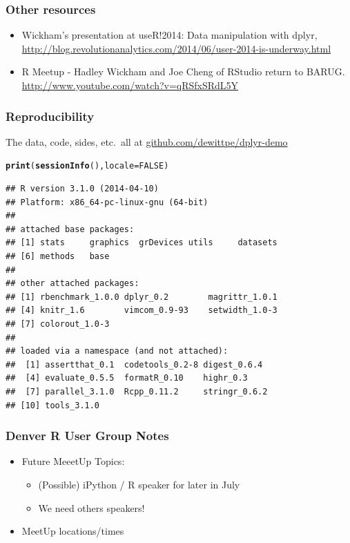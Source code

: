 \documentclass{beamer}\usepackage[]{graphicx}\usepackage[]{color}
\makeatletter
\newcommand{\hlnum}[1]{\textcolor[rgb]{0.686,0.059,0.569}{#1}}%
\newcommand{\hlstd}[1]{\textcolor[rgb]{0.345,0.345,0.345}{#1}}%
\newcommand{\hlkwc}[1]{\textcolor[rgb]{0.333,0.667,0.333}{#1}}%
\newcommand{\hlkwd}[1]{\textcolor[rgb]{0.737,0.353,0.396}{\textbf{#1}}}%
\newenvironment{kframe}{%
 \def\at@end@of@kframe{}%
 \ifinner\ifhmode%
  \def\at@end@of@kframe{\end{minipage}}%
  \begin{minipage}{\columnwidth}%
 \fi\fi%
 \def\FrameCommand##1{\hskip\@totalleftmargin \hskip-\fboxsep
 \colorbox{shadecolor}{##1}\hskip-\fboxsep
     \hskip-\linewidth \hskip-\@totalleftmargin \hskip\columnwidth}%
 \MakeFramed {\advance\hsize-\width
   \@totalleftmargin\z@ \linewidth\hsize
   \@setminipage}}%
 {\par\unskip\endMakeFramed%
 \at@end@of@kframe}
\newenvironment{knitrout}{}{} %
\makeatother
\begin{document}
\begin{frame}[fragile]
  \frametitle{Other resources}
  \begin{itemize}
    \item Wickham's presentation at useR!2014: Data manipulation with dplyr,
      \url{http://blog.revolutionanalytics.com/2014/06/user-2014-is-underway.html}

    \item R Meetup - Hadley Wickham and Joe Cheng of RStudio return to BARUG.
      \url{http://www.youtube.com/watch?v=qRSfxSRdL5Y}

  \end{itemize}
\end{frame} 

\begin{frame}[fragile]
  \frametitle{Reproducibility}
  The data, code, sides, etc.\ all at \url{github.com/dewittpe/dplyr-demo}

\begin{knitrout}\footnotesize
{}\color{fgcolor}\begin{kframe}
\begin{alltt}
\hlkwd{print}\hlstd{(}\hlkwd{sessionInfo}\hlstd{(),} \hlkwc{locale} \hlstd{=} \hlnum{FALSE}\hlstd{)}
\end{alltt}
\begin{verbatim}
## R version 3.1.0 (2014-04-10)
## Platform: x86_64-pc-linux-gnu (64-bit)
## 
## attached base packages:
## [1] stats     graphics  grDevices utils     datasets 
## [6] methods   base     
## 
## other attached packages:
## [1] rbenchmark_1.0.0 dplyr_0.2        magrittr_1.0.1  
## [4] knitr_1.6        vimcom_0.9-93    setwidth_1.0-3  
## [7] colorout_1.0-3  
## 
## loaded via a namespace (and not attached):
##  [1] assertthat_0.1  codetools_0.2-8 digest_0.6.4   
##  [4] evaluate_0.5.5  formatR_0.10    highr_0.3      
##  [7] parallel_3.1.0  Rcpp_0.11.2     stringr_0.6.2  
## [10] tools_3.1.0
\end{verbatim}
\end{kframe}
\end{knitrout}
\end{frame} 

\begin{frame}[fragile]
  \frametitle{Denver R User Group Notes}
  \begin{itemize}
    \item Future MeeetUp Topics:
      \begin{itemize}
        \item (Possible) iPython / R speaker for later in July
        \item We need others speakers!
      \end{itemize}
    \item MeetUp locations/times
  \end{itemize}
\end{frame} 
\end{document}
